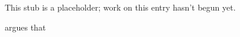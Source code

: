This stub is a placeholder; work on this entry hasn't begun yet.

\citet{Lewis1981} argues that \lipsum[1]

\lipsum[2-3]
